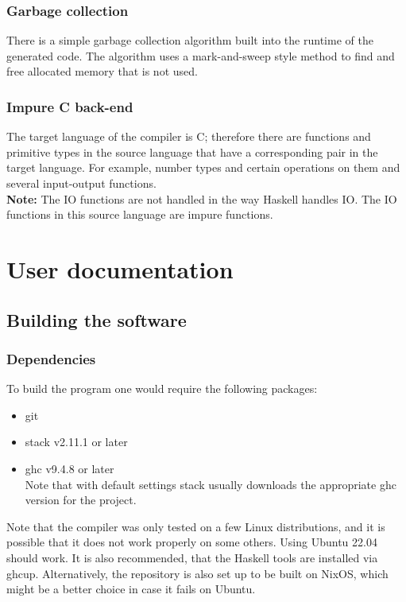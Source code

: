 \documentclass[12pt]{article}
\begin{document}
\subsubsection{Garbage collection}

There is a simple garbage collection algorithm built into the runtime of the
generated code. The algorithm uses a mark-and-sweep style method to find and
free allocated memory that is not used.

\subsubsection{Impure C back-end}

The target language of the compiler is C; therefore there are functions and
primitive types in the source language that have a corresponding pair in the
target language. For example, number types and certain operations on them and
several input-output functions. \\ \textbf{Note:} The IO functions are not handled in
the way Haskell handles IO. The IO functions in this source language are impure
functions.

\section{User documentation}

\subsection{Building the software}
\subsubsection{Dependencies}

To build the program one would require the following packages:
\begin{itemize}
    \item git
    \item stack v2.11.1 or later
    \item ghc v9.4.8 or later \\ Note that with default settings stack usually
        downloads the appropriate ghc version for the project.
\end{itemize}
Note that the compiler was only tested on a few Linux distributions, and it is
possible that it does not work properly on some others. Using Ubuntu 22.04
should work. It is also recommended, that the Haskell tools are installed via
ghcup. Alternatively, the repository is also set up to be built on NixOS, which
might be a better choice in case it fails on Ubuntu.
\end{document}
